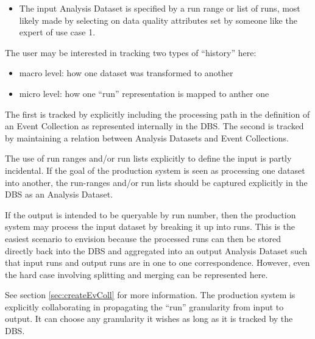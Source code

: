 \documentclass{cmspaper}
\begin{document}
{%

\begin{itemize}
\item The input Analysis Dataset is specified by a run range or list
     of runs, most likely made by selecting on data quality attributes set by
     someone like the expert of use case 1.  
\end{itemize}

The user may be interested in tracking two types of ``history'' here:
\begin{itemize}
      \item macro level: how one dataset was transformed to another
      \item micro level: how one ``run'' representation is mapped to anther one
\end{itemize}
The first is tracked by explicitly including the processing path in the
definition of an Event Collection as represented internally in the DBS.  
The second is tracked by maintaining a relation between Analysis Datasets
and Event Collections.

The use of run ranges and/or run lists explicitly to define the input is 
partly incidental. If the goal of the production system is seen as
processing one dataset into another, the run-ranges and/or run lists 
should be captured explicitly in the DBS as an Analysis Dataset. 

If the output is intended to be queryable by run number, then the
production system may process the input dataset by breaking it up into
runs.  This is the easiest scenario to envision because the processed
runs can then be stored directly back into the DBS and aggregated into an
output Analysis Dataset such that input runs and output runs are in one
to one correspondence.  However, even the hard case involving splitting
and merging can be represented here.

See section \ref{sec:createEvColl} for more information. 
The production system is explicitly collaborating in propagating the
``run'' granularity from input to output.  It can choose any granularity it 
wishes as long as it is tracked by the DBS.  

}
\end{document}
